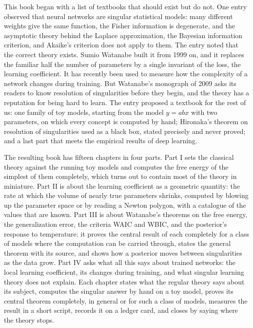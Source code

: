 
This book began with a list of textbooks that should exist but do not. One entry observed that neural networks are singular statistical models: many different weights give the same function, the Fisher information is degenerate, and the asymptotic theory behind the Laplace approximation, the Bayesian information criterion, and Akaike's criterion does not apply to them. The entry noted that the correct theory exists. Sumio Watanabe built it from 1999 on, and it replaces the familiar half the number of parameters by a single invariant of the loss, the learning coefficient. It has recently been used to measure how the complexity of a network changes during training. But Watanabe's monograph of 2009 asks its readers to know resolution of singularities before they begin, and the theory has a reputation for being hard to learn. The entry proposed a textbook for the rest of us: one family of toy models, starting from the model $y=abx$ with two parameters, on which every concept is computed by hand; Hironaka's theorem on resolution of singularities used as a black box, stated precisely and never proved; and a last part that meets the empirical results of deep learning.

The resulting book has fifteen chapters in four parts. Part I sets the classical theory against the running toy models and computes the free energy of the simplest of them completely, which turns out to contain most of the theory in miniature. Part II is about the learning coefficient as a geometric quantity: the rate at which the volume of nearly true parameters shrinks, computed by blowing up the parameter space or by reading a Newton polygon, with a catalogue of the values that are known. Part III is about Watanabe's theorems on the free energy, the generalization error, the criteria WAIC and WBIC, and the posterior's response to temperature: it proves the central result of each completely for a class of models where the computation can be carried through, states the general theorem with its source, and shows how a posterior moves between singularities as the data grow. Part IV asks what all this says about trained networks: the local learning coefficient, its changes during training, and what singular learning theory does not explain. Each chapter states what the regular theory says about its subject, computes the singular answer by hand on a toy model, proves its central theorem completely, in general or for such a class of models, measures the result in a short script, records it on a ledger card, and closes by saying where the theory stops.


